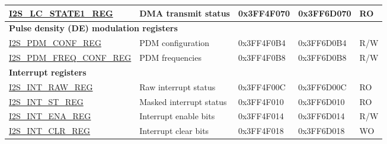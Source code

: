 \begin{longtable}{ | p{5.8cm} | p{5cm} | p{1.9cm} | p{1.9cm} | p{0.7cm} | }
\hyperref[regdesc:I2SLCSTATE1REG]{I2S\_LC\_STATE1\_REG} & DMA transmit status & 0x3FF4F070 & 0x3FF6D070 & RO \\ \hline
\multicolumn{5}{|l|}{\textbf{Pulse density (DE) modulation registers}} \\ \hline
\hyperref[regdesc:I2SPDMCONFREG]{I2S\_PDM\_CONF\_REG} & PDM configuration & 0x3FF4F0B4 & 0x3FF6D0B4 & R/W \\ \hline
\hyperref[regdesc:I2SPDMFREQCONFREG]{I2S\_PDM\_FREQ\_CONF\_REG} & PDM frequencies & 0x3FF4F0B8 & 0x3FF6D0B8 & R/W \\ \hline
\multicolumn{5}{|l|}{\textbf{Interrupt registers}} \\ \hline
\hyperref[regdesc:I2SINTRAWREG]{I2S\_INT\_RAW\_REG} & Raw interrupt status & 0x3FF4F00C & 0x3FF6D00C & RO \\ \hline
\hyperref[regdesc:I2SINTSTREG]{I2S\_INT\_ST\_REG} & Masked interrupt status & 0x3FF4F010 & 0x3FF6D010 & RO \\ \hline
\hyperref[regdesc:I2SINTENAREG]{I2S\_INT\_ENA\_REG} & Interrupt enable bits & 0x3FF4F014 & 0x3FF6D014 & R/W \\ \hline
\hyperref[regdesc:I2SINTCLRREG]{I2S\_INT\_CLR\_REG} & Interrupt clear bits & 0x3FF4F018 & 0x3FF6D018 & WO \\ \hline
\end{longtable}

